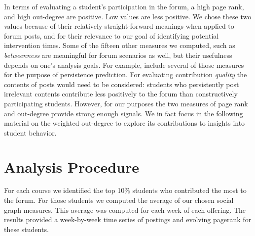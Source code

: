 In terms of evaluating a student's participation in the forum, a high
page rank, and high out-degree are positive. Low values are less
positive. We chose these two values because of their relatively
straight-forward meanings when applied to forum posts, and for their
relevance to our goal of identifying potential intervention times.
Some of the fifteen other measures we computed, such as {\em
  betweenness} are meaningful for forum scenarios as well, but their
usefulness depends on one's analysis goals. For example,
\cite{yang2013} include several of those measures for the purpose of
persistence prediction. For evaluating contribution {\em quality} the
contents of posts would need to be considered: students who
persistently post irrelevant contents contribute less positively to
the forum than constructively participating students. However, for our
purposes the two measures of page rank and out-degree provide strong
enough signals. We in fact focus in the following material on the
weighted out-degree to explore its contributions to insights into
student behavior.

\section{Analysis Procedure}

For each course we identified the top 10\% students who contributed
the most to the forum. For those students we computed the average of
our chosen social graph measures. This average was computed for each
week of each offering. The results provided a week-by-week time series
of postings and evolving pagerank for these students.

